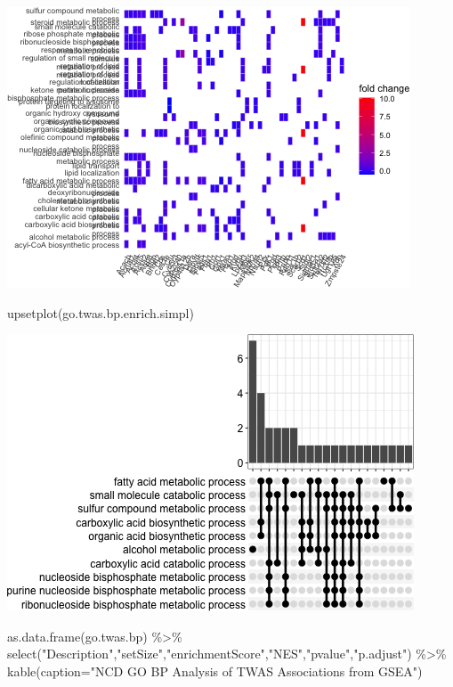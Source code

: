\documentclass[
]{article}
\newenvironment{Shaded}{\begin{snugshade}}{\end{snugshade}}
\newcommand{\AttributeTok}[1]{\textcolor[rgb]{0.77,0.63,0.00}{#1}}
\newcommand{\FunctionTok}[1]{\textcolor[rgb]{0.00,0.00,0.00}{#1}}
\newcommand{\NormalTok}[1]{#1}
\newcommand{\SpecialCharTok}[1]{\textcolor[rgb]{0.00,0.00,0.00}{#1}}
\newcommand{\StringTok}[1]{\textcolor[rgb]{0.31,0.60,0.02}{#1}}
\begin{document}
\includegraphics{figures/twas-go-ncd-8.png}

\begin{Shaded}
\begin{Highlighting}[]
\FunctionTok{upsetplot}\NormalTok{(go.twas.bp.enrich.simpl)}
\end{Highlighting}
\end{Shaded}

\includegraphics{figures/twas-go-ncd-9.png}

\begin{Shaded}
\begin{Highlighting}[]
\FunctionTok{as.data.frame}\NormalTok{(go.twas.bp) }\SpecialCharTok{\%\textgreater{}\%} \FunctionTok{select}\NormalTok{(}\StringTok{"Description"}\NormalTok{,}\StringTok{"setSize"}\NormalTok{,}\StringTok{"enrichmentScore"}\NormalTok{,}\StringTok{"NES"}\NormalTok{,}\StringTok{"pvalue"}\NormalTok{,}\StringTok{"p.adjust"}\NormalTok{) }\SpecialCharTok{\%\textgreater{}\%}
  \FunctionTok{kable}\NormalTok{(}\AttributeTok{caption=}\StringTok{"NCD GO BP Analysis of TWAS Associations from GSEA"}\NormalTok{)}
\end{Highlighting}
\end{Shaded}
\end{document}
